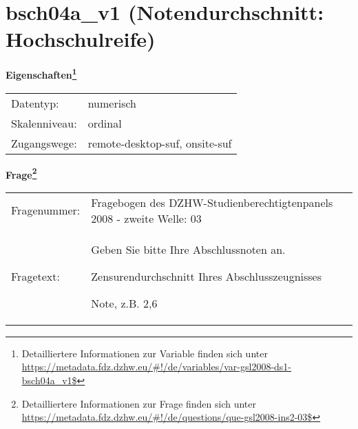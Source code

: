 
    \setcounter{footnote}{0}

    \vspace*{-1.8cm}
	\section{bsch04a\_v1 (Notendurchschnitt: Hochschulreife)}
	\label{section:bsch04a_v1}



    \vspace*{0.5cm}
    \noindent\textbf{Eigenschaften\footnote{Detailliertere Informationen zur Variable finden sich unter
		\url{https://metadata.fdz.dzhw.eu/\#!/de/variables/var-gsl2008-ds1-bsch04a_v1$}}}\\
	\begin{tabularx}{\hsize}{@{}lX}
	Datentyp: & numerisch \\
	Skalenniveau: & ordinal \\
	Zugangswege: &
	  remote-desktop-suf, 
	  onsite-suf
 \\
    \end{tabularx}



				\vspace*{0.5cm}
                \noindent\textbf{Frage\footnote{Detailliertere Informationen zur Frage finden sich unter
		              \url{https://metadata.fdz.dzhw.eu/\#!/de/questions/que-gsl2008-ins2-03$}}}\\
				\begin{tabularx}{\hsize}{@{}lX}
					Fragenummer: &
					  Fragebogen des DZHW-Studienberechtigtenpanels 2008 - zweite Welle:
					  03
 \\
					Fragetext: & Geben Sie bitte Ihre Abschlussnoten an.\par  Zensurendurchschnitt Ihres Abschlusszeugnisses\par  Note, z.B. 2,6 \\
				\end{tabularx}





